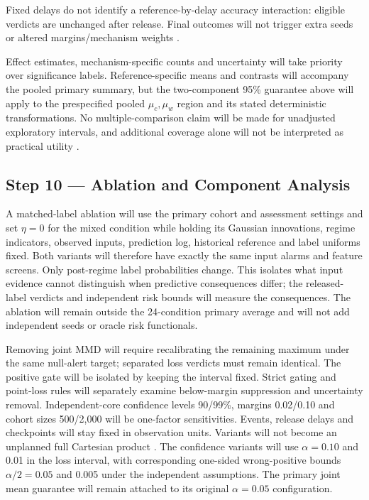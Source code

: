 \documentclass[11pt,a4paper]{article}
\begin{document}
Fixed delays do not identify a reference-by-delay accuracy
interaction: eligible verdicts are unchanged after release. Final outcomes will
not trigger extra seeds or altered margins/mechanism weights \cite{hoeffding,souza}.

Effect estimates, mechanism-specific counts and uncertainty will take priority
over significance labels. Reference-specific means and contrasts will accompany
the pooled primary summary, but the two-component 95\% guarantee above will
apply to the prespecified pooled $\mu_c,\mu_w$ region and its stated
deterministic transformations. No multiple-comparison
claim will be made for unadjusted exploratory intervals, and additional coverage
alone will not be interpreted as practical utility \cite{selective,souza}.

\subsection*{Step 10 --- Ablation and Component Analysis}
A matched-label ablation will use the primary cohort and assessment settings
and set $\eta=0$ for the mixed condition while
holding its Gaussian innovations, regime indicators, observed inputs,
prediction log, historical reference and label uniforms fixed. Both variants
will therefore have exactly the same input alarms and feature screens.
Only post-regime label probabilities change. This isolates what input
evidence cannot distinguish when predictive consequences differ; the
released-label verdicts and independent risk bounds will measure the
consequences. The ablation will remain outside the 24-condition primary
average and will not add independent seeds or oracle risk functionals.

Removing joint MMD will require recalibrating the remaining maximum under the
same null-alert target; separated loss verdicts must remain identical. The
positive gate will be isolated by keeping the interval fixed. Strict gating
and point-loss rules will separately examine below-margin suppression and
uncertainty removal. Independent-core confidence levels 90/99\%, margins 0.02/0.10 and cohort
sizes 500/2,000 will be one-factor sensitivities. Events, release delays and
checkpoints will stay fixed in observation units. Variants will not become an
unplanned full Cartesian product \cite{gretton,cerqueira,alencar}.
The confidence variants will use $\alpha=0.10$ and 0.01 in the loss interval,
with corresponding one-sided wrong-positive bounds $\alpha/2=0.05$ and
0.005 under the independent assumptions. The primary joint mean guarantee
will remain attached to its original $\alpha=0.05$ configuration.
\end{document}

